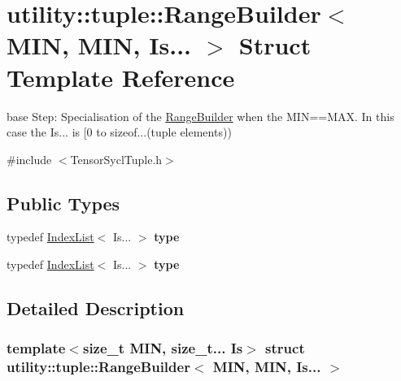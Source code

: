 \hypertarget{structutility_1_1tuple_1_1_range_builder_3_01_m_i_n_00_01_m_i_n_00_01_is_8_8_8_01_4}{}\section{utility\+:\+:tuple\+:\+:Range\+Builder$<$ M\+IN, M\+IN, Is... $>$ Struct Template Reference}
\label{structutility_1_1tuple_1_1_range_builder_3_01_m_i_n_00_01_m_i_n_00_01_is_8_8_8_01_4}


base Step\+: Specialisation of the \hyperlink{structutility_1_1tuple_1_1_range_builder}{Range\+Builder} when the M\+IN==M\+AX. In this case the Is... is \mbox{[}0 to sizeof...(tuple elements))  




{\ttfamily \#include $<$Tensor\+Sycl\+Tuple.\+h$>$}

\subsection*{Public Types}
\begin{DoxyCompactItemize}
\item 
\mbox{\label{structutility_1_1tuple_1_1_range_builder_3_01_m_i_n_00_01_m_i_n_00_01_is_8_8_8_01_4_ab785783a9be537af73a1743cad251775}} 
typedef \hyperlink{structutility_1_1tuple_1_1_index_list}{Index\+List}$<$ Is... $>$ {\bfseries type}
\item 
\mbox{\label{structutility_1_1tuple_1_1_range_builder_3_01_m_i_n_00_01_m_i_n_00_01_is_8_8_8_01_4_ab785783a9be537af73a1743cad251775}} 
typedef \hyperlink{structutility_1_1tuple_1_1_index_list}{Index\+List}$<$ Is... $>$ {\bfseries type}
\end{DoxyCompactItemize}


\subsection{Detailed Description}
\subsubsection*{template$<$size\+\_\+t M\+IN, size\+\_\+t... Is$>$\newline
struct utility\+::tuple\+::\+Range\+Builder$<$ M\+I\+N, M\+I\+N, Is... $>$}

